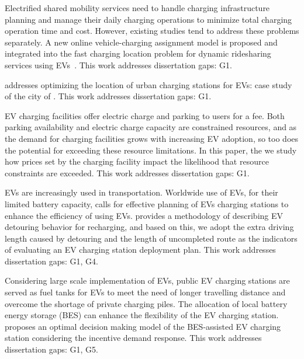 \documentclass[letterpaper, 12pt, oneside, doublespacing]{Thesis}
\begin{document}
\noindent Electrified shared mobility services need to handle charging infrastructure planning and manage their daily charging operations to minimize total charging operation time and cost. However, existing studies tend to address these problems separately. A new online vehicle-charging assignment model is proposed and integrated into the fast charging location problem for dynamic ridesharing services using EVs~\cite{optimal_fast_2020}. This work addresses dissertation gaps: G1.



\noindent \cite{optimizing_the_2020} addresses optimizing the location of urban charging stations for EVs: case study of the city of . This work addresses dissertation gaps: G1.



\noindent EV charging facilities offer electric charge and parking to users for a fee. Both parking availability and electric charge capacity are constrained resources, and as the demand for charging facilities grows with increasing EV adoption, so too does the potential for exceeding these resource limitations. In this paper, the we \cite{resource_aware_2020} study how prices set by the charging facility impact the likelihood that resource constraints are exceeded. This work addresses dissertation gaps: G1.



\noindent EVs are increasingly used in transportation. Worldwide use of EVs, for their limited battery capacity, calls for effective planning of EVs charging stations to enhance the efficiency of using EVs. \cite{a_method_2019} provides a methodology of describing EV detouring behavior for recharging, and based on this, we adopt the extra driving length caused by detouring and the length of uncompleted route as the indicators of evaluating an EV charging station deployment plan. This work addresses dissertation gaps: G1, G4.



\noindent Considering large scale implementation of EVs, public EV charging stations are served as fuel tanks for EVs to meet the need of longer travelling distance and overcome the shortage of private charging piles. The allocation of local battery energy storage (BES) can enhance the flexibility of the EV charging station. \cite{optimal_decision_2019} proposes an optimal decision making model of the BES-assisted EV charging station considering the incentive demand response. This work addresses dissertation gaps: G1, G5.
\end{document}
